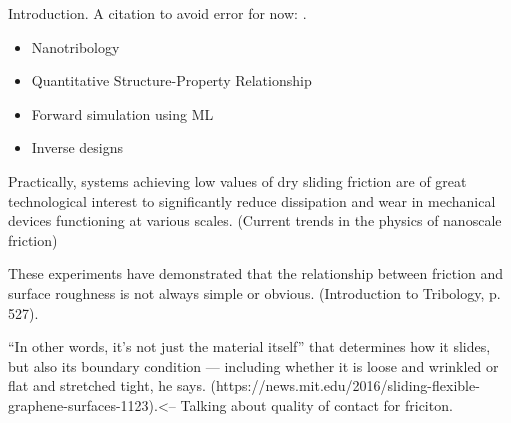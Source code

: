 \newpage
Introduction. A citation to avoid error for now: \cite{li_evolving_2016}.

\begin{itemize}
    \item Nanotribology
    \item Quantitative Structure-Property Relationship
    \item Forward simulation using ML
    \item Inverse designs
\end{itemize}


Practically, systems achieving low values of dry sliding friction are of great technological interest to significantly reduce dissipation and wear in mechanical devices functioning at various scales. (Current trends in the physics of nanoscale friction)

These experiments have demonstrated that the relationship between friction and surface roughness is not always simple or obvious. (Introduction to Tribology, p. 527).


“In other words, it’s not just the material itself” that determines how it slides, but also its boundary condition — including whether it is loose and wrinkled or flat and stretched tight, he says. (https://news.mit.edu/2016/sliding-flexible-graphene-surfaces-1123).<-- Talking about quality of contact for friciton.